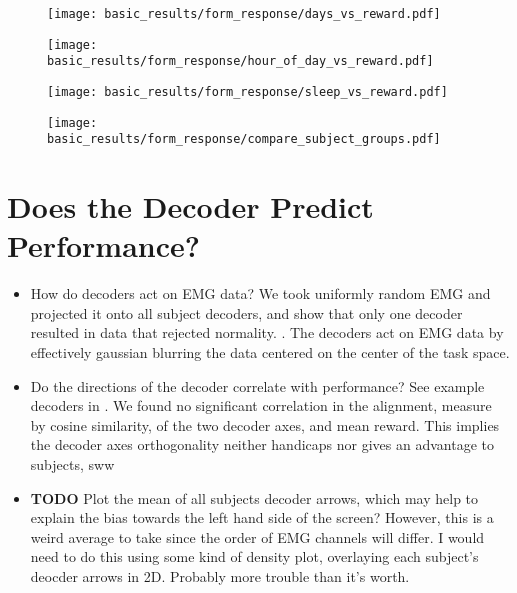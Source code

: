 \documentclass[../main.tex]{subfiles}
\begin{document}
\begin{figure}[H]%
    \centering
    \texttt{[image: basic\_results/form\_response/days\_vs\_reward.pdf]}
    \caption[Experiment day versus reward]{}\label{fig:days_vs_reward}
\end{figure}

\begin{figure}[H]%
    \centering
    \texttt{[image: basic\_results/form\_response/hour\_of\_day\_vs\_reward.pdf]}
    \caption[Hour of day versus reward]{}\label{fig:hour_of_day_vs_reward}
\end{figure}

\begin{figure}[H]%
    \centering
    \texttt{[image: basic\_results/form\_response/sleep\_vs\_reward.pdf]}
    \caption[Hours of sleep vs reward]{}\label{fig:sleep_vs_reward}
\end{figure}

\begin{figure}[H]%
    \centering
    \texttt{[image: basic\_results/form\_response/compare\_subject\_groups.pdf]}
    \caption[Subject group comparisons]{}\label{fig:compare_subject_groups}
\end{figure}



\section{Does the Decoder Predict Performance?}

\begin{itemize}
    \setlength\itemsep{0em}
    \item How do decoders act on EMG data? We took uniformly random EMG and projected it onto all subject decoders, and show that only one decoder resulted in data that rejected normality. . The decoders act on EMG data by effectively gaussian blurring the data centered on the center of the task space.
    \item Do the directions of the decoder correlate with performance? See example decoders in . We found no significant correlation in the alignment, measure by cosine similarity, of the two decoder axes, and mean reward. This implies the decoder axes orthogonality neither handicaps nor gives an advantage to subjects, sww 
    \item \textbf{TODO} Plot the mean of all subjects decoder arrows, which may help to explain the bias towards the left hand side of the screen? However, this is a weird average to take since the order of EMG channels will differ. I would need to do this using some kind of density plot, overlaying each subject's deocder arrows in 2D. Probably more trouble than it's worth.
\end{itemize}
\end{document}
